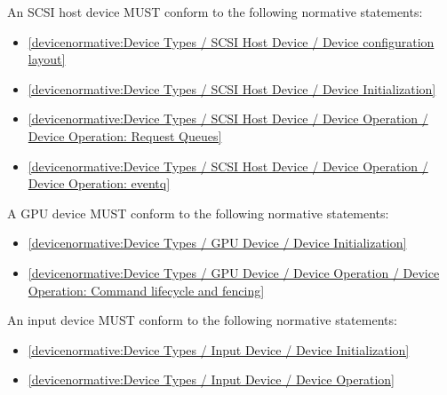 \label{sec:Conformance / Device Conformance / SCSI Host Device Conformance}

An SCSI host device MUST conform to the following normative statements:

\begin{itemize}
\item \ref{devicenormative:Device Types / SCSI Host Device / Device configuration layout}
\item \ref{devicenormative:Device Types / SCSI Host Device / Device Initialization}
\item \ref{devicenormative:Device Types / SCSI Host Device / Device Operation / Device Operation: Request Queues}
\item \ref{devicenormative:Device Types / SCSI Host Device / Device Operation / Device Operation: eventq}
\end{itemize}

\label{sec:Conformance / Device Conformance / GPU Device Conformance}

A GPU device MUST conform to the following normative statements:

\begin{itemize}
\item \ref{devicenormative:Device Types / GPU Device / Device Initialization}
\item \ref{devicenormative:Device Types / GPU Device / Device Operation / Device Operation: Command lifecycle and fencing}
\end{itemize}

\label{sec:Conformance / Device Conformance / Input Device Conformance}

An input device MUST conform to the following normative statements:

\begin{itemize}
\item \ref{devicenormative:Device Types / Input Device / Device Initialization}
\item \ref{devicenormative:Device Types / Input Device / Device Operation}
\end{itemize}

